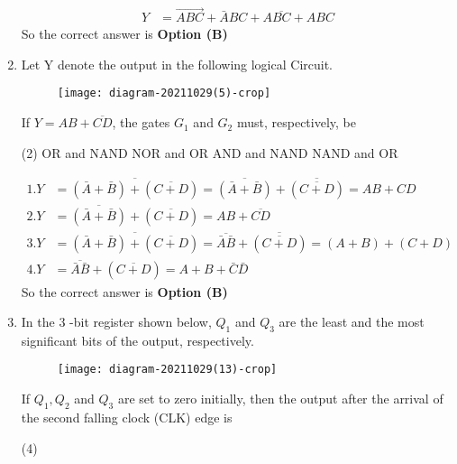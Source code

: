 \begin{enumerate}
\begin{answer}
\begin{align*}
Y&=\overrightarrow{A B C}+\bar{A} B C+A \overline{B C}+A B C
\end{align*}
So the correct answer is \textbf{Option (B)}
\end{answer}
\item Let Y denote the output in the following logical Circuit.\\
\begin{figure}[H]
	\centering	\texttt{[image: diagram-20211029(5)-crop]}
\end{figure}
If $Y=A B+\overline{C D}$, the gates $G_{1}$ and $G_{2}$ must, respectively, be
{}
\begin{tasks}(2)
\task[\textbf{A.}] OR and NAND
\task[\textbf{B.}] NOR and OR
\task[\textbf{C.}] AND and NAND
\task[\textbf{D.}] NAND and OR
\end{tasks}
\begin{answer}
\begin{align*}
1. Y&=\overline{(\bar{A}+\bar{B})+(\overline{C+D})}=\overline{(\bar{A}+\bar{B})}+\overline{(\overline{C+D})}=A B+C D\\
2. Y&=\overline{(\bar{A}+\bar{B})}+(\overline{C+D})=A B+\overline{C D}\\
3.Y&=\overline{(\bar{A}+\bar{B})+(\overline{C+D})}=\overline{\bar{A} \bar{B}}+\overline{(\overline{C+D})}=(A+B)+(C+D)\\
4. Y&=\overline{\bar{A} \bar{B}}+(\overline{C+D})=A+B+\bar{C} \bar{D}
\end{align*}
So the correct answer is \textbf{Option (B)}
\end{answer}
\item In the 3 -bit register shown below, $Q_{1}$ and $Q_{3}$ are the least and the most significant bits of the output, respectively.\\
\begin{figure}[H]
	\centering
	\texttt{[image: diagram-20211029(13)-crop]}
\end{figure}
If $Q_{1}, Q_{2}$ and $Q_{3}$ are set to zero initially, then the output after the arrival of the second falling clock (CLK) edge is
{}
\begin{tasks}(4)
\end{tasks}
\begin{answer}
\begin{align*}

\end{align*}
\end{answer}
\end{enumerate}
